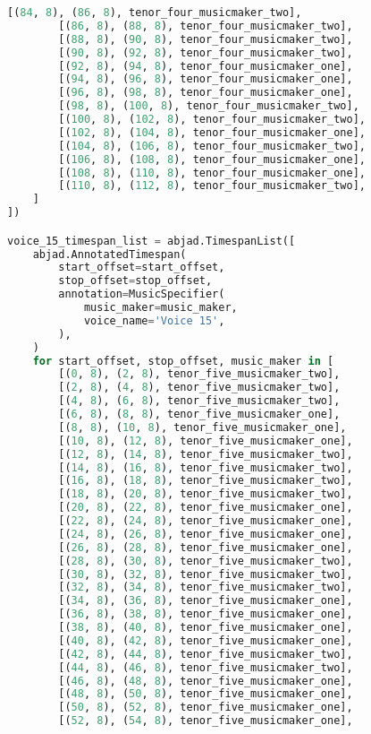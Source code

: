 \begin{lstlisting}[language=Python, caption=Invocation Source Code]
        [(84, 8), (86, 8), tenor_four_musicmaker_two],
        [(86, 8), (88, 8), tenor_four_musicmaker_two],
        [(88, 8), (90, 8), tenor_four_musicmaker_two],
        [(90, 8), (92, 8), tenor_four_musicmaker_two],
        [(92, 8), (94, 8), tenor_four_musicmaker_one],
        [(94, 8), (96, 8), tenor_four_musicmaker_one],
        [(96, 8), (98, 8), tenor_four_musicmaker_one],
        [(98, 8), (100, 8), tenor_four_musicmaker_two],
        [(100, 8), (102, 8), tenor_four_musicmaker_two],
        [(102, 8), (104, 8), tenor_four_musicmaker_one],
        [(104, 8), (106, 8), tenor_four_musicmaker_two],
        [(106, 8), (108, 8), tenor_four_musicmaker_one],
        [(108, 8), (110, 8), tenor_four_musicmaker_one],
        [(110, 8), (112, 8), tenor_four_musicmaker_two],
    ]
])

voice_15_timespan_list = abjad.TimespanList([
    abjad.AnnotatedTimespan(
        start_offset=start_offset,
        stop_offset=stop_offset,
        annotation=MusicSpecifier(
            music_maker=music_maker,
            voice_name='Voice 15',
        ),
    )
    for start_offset, stop_offset, music_maker in [
        [(0, 8), (2, 8), tenor_five_musicmaker_two],
        [(2, 8), (4, 8), tenor_five_musicmaker_two],
        [(4, 8), (6, 8), tenor_five_musicmaker_two],
        [(6, 8), (8, 8), tenor_five_musicmaker_one],
        [(8, 8), (10, 8), tenor_five_musicmaker_one],
        [(10, 8), (12, 8), tenor_five_musicmaker_one],
        [(12, 8), (14, 8), tenor_five_musicmaker_two],
        [(14, 8), (16, 8), tenor_five_musicmaker_two],
        [(16, 8), (18, 8), tenor_five_musicmaker_two],
        [(18, 8), (20, 8), tenor_five_musicmaker_two],
        [(20, 8), (22, 8), tenor_five_musicmaker_one],
        [(22, 8), (24, 8), tenor_five_musicmaker_one],
        [(24, 8), (26, 8), tenor_five_musicmaker_one],
        [(26, 8), (28, 8), tenor_five_musicmaker_one],
        [(28, 8), (30, 8), tenor_five_musicmaker_two],
        [(30, 8), (32, 8), tenor_five_musicmaker_two],
        [(32, 8), (34, 8), tenor_five_musicmaker_two],
        [(34, 8), (36, 8), tenor_five_musicmaker_one],
        [(36, 8), (38, 8), tenor_five_musicmaker_one],
        [(38, 8), (40, 8), tenor_five_musicmaker_one],
        [(40, 8), (42, 8), tenor_five_musicmaker_one],
        [(42, 8), (44, 8), tenor_five_musicmaker_two],
        [(44, 8), (46, 8), tenor_five_musicmaker_two],
        [(46, 8), (48, 8), tenor_five_musicmaker_one],
        [(48, 8), (50, 8), tenor_five_musicmaker_one],
        [(50, 8), (52, 8), tenor_five_musicmaker_one],
        [(52, 8), (54, 8), tenor_five_musicmaker_one],

\end{lstlisting}
